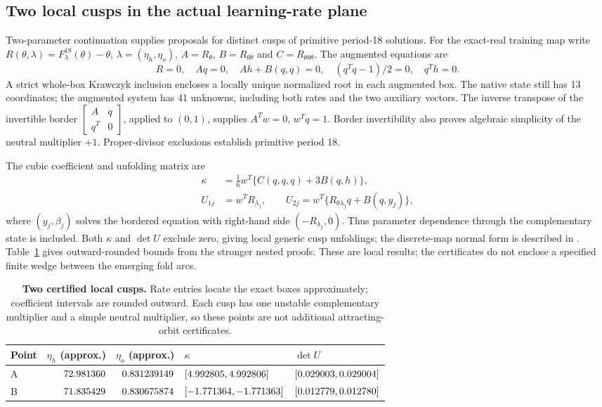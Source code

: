 \documentclass[11pt,letterpaper]{article}
\begin{document}
\subsection{Two local cusps in the actual learning-rate plane}
\label{sec:cusp-proof}

Two-parameter continuation supplies proposals for \nLocalCusps{} distinct
cusps of primitive period-18 solutions. For the exact-real training map write
$R(\theta,\lambda)=F_\lambda^{18}(\theta)-\theta$,
$\lambda=(\eta_h,\eta_o)$, $A=R_\theta$,
$B=R_{\theta\theta}$ and $C=R_{\theta\theta\theta}$.
The augmented equations are
\begin{equation}
 R=0,\quad Aq=0,\quad Ah+B(q,q)=0,\quad
 (q^Tq-1)/2=0,\quad q^Th=0.
\end{equation}
A strict whole-box Krawczyk inclusion encloses a locally unique normalized root
in each augmented box. The native state still has 13 coordinates; the augmented
system has 41 unknowns, including both rates and the two auxiliary vectors.
The inverse transpose of the invertible border
$\left[\begin{smallmatrix}A&q\\q^T&0\end{smallmatrix}\right]$, applied to $(0,1)$,
supplies $A^Tw=0$, $w^Tq=1$. Border invertibility also proves algebraic
simplicity of the neutral multiplier $+1$. Proper-divisor exclusions establish primitive period 18.

The cubic coefficient and unfolding matrix are
\begin{align}
 \kappa&=\frac16w^T\{C(q,q,q)+3B(q,h)\},\\
 U_{1j}&=w^TR_{\lambda_j},\qquad
 U_{2j}=w^T\{R_{\theta\lambda_j}q+B(q,y_j)\},
\end{align}
where $(y_j,\beta_j)$ solves the bordered equation with right-hand side
$(-R_{\lambda_j},0)$. Thus parameter dependence through the complementary
state is included. Both $\kappa$ and $\det U$ exclude zero, giving local
generic cusp unfoldings; the discrete-map normal form is described in
\citet[Section~5.1]{meijer2017matcontm}. Table~\ref{tab:cusps} gives outward-rounded bounds
from the stronger nested proofs. These are local results; the certificates
do not enclose a specified finite wedge between the emerging fold arcs.

\begin{table}[htbp]
\centering\small
\setlength{\tabcolsep}{4pt}
\begin{tabular}{@{}l r r l l@{}}
\toprule
Point & $\eta_h$ (approx.) & $\eta_o$ (approx.) & $\kappa$ & $\det U$ \\
\midrule
A & $72.981360$ & $0.831239149$ & $[4.992805, 4.992806]$ & $[0.029003, 0.029004]$ \\
B & $71.835429$ & $0.830675874$ & $[-1.771364, -1.771363]$ & $[0.012779, 0.012780]$ \\
\bottomrule
\end{tabular}
\caption{\textbf{Two certified local cusps.} Rate entries locate the exact
boxes approximately; coefficient intervals are rounded outward. Each cusp has
one unstable complementary multiplier and a simple neutral multiplier, so
these points are not additional attracting-orbit certificates.}
\label{tab:cusps}
\end{table}
\end{document}
